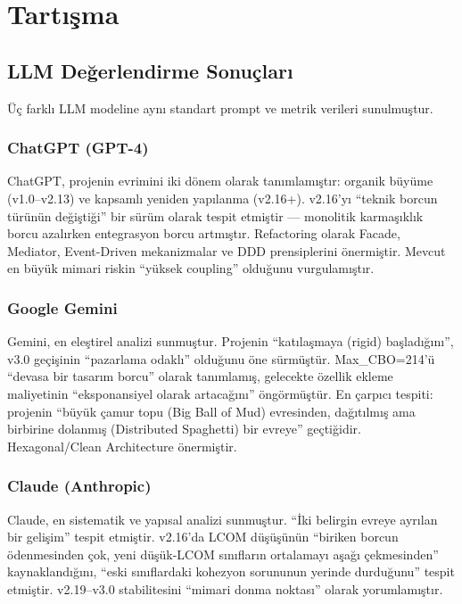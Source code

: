 \documentclass[conference]{IEEEtran}
\begin{document}
\section{Tart{\i}\c{s}ma}

\subsection{LLM De\u{g}erlendirme Sonu\c{c}lar{\i}}
\"U\c{c} farkl{\i} LLM modeline ayn{\i} standart prompt ve metrik verileri sunulmu\c{s}tur.

\subsubsection{ChatGPT (GPT-4)}
ChatGPT, projenin evrimini iki d\"onem olarak tan{\i}mlam{\i}\c{s}t{\i}r: organik b\"uy\"ume (v1.0--v2.13) ve kapsaml{\i} yeniden yap{\i}lanma (v2.16+). v2.16'y{\i} ``teknik borcun t\"ur\"un\"un de\u{g}i\c{s}ti\u{g}i'' bir s\"ur\"um olarak tespit etmi\c{s}tir --- monolitik karma\c{s}{\i}kl{\i}k borcu azal{\i}rken entegrasyon borcu artm{\i}\c{s}t{\i}r. Refactoring olarak Facade, Mediator, Event-Driven mekanizmalar ve DDD prensiplerini \"onermi\c{s}tir. Mevcut en b\"uy\"uk mimari riskin ``y\"uksek coupling'' oldu\u{g}unu vurgulam{\i}\c{s}t{\i}r.

\subsubsection{Google Gemini}
Gemini, en ele\c{s}tirel analizi sunmu\c{s}tur. Projenin ``kat{\i}la\c{s}maya (rigid) ba\c{s}lad{\i}\u{g}{\i}n{\i}'', v3.0 ge\c{c}i\c{s}inin ``pazarlama odakl{\i}'' oldu\u{g}unu \"one s\"urm\"u\c{s}t\"ur. Max\_CBO=214'\"u ``devasa bir tasar{\i}m borcu'' olarak tan{\i}mlam{\i}\c{s}, gelecekte \"ozellik ekleme maliyetinin ``eksponansiyel olarak artaca\u{g}{\i}n{\i}'' \"ong\"orm\"u\c{s}t\"ur. En \c{c}arp{\i}c{\i} tespiti: projenin ``b\"uy\"uk \c{c}amur topu (Big Ball of Mud) evresinden, da\u{g}{\i}t{\i}lm{\i}\c{s} ama birbirine dolanm{\i}\c{s} (Distributed Spaghetti) bir evreye'' ge\c{c}ti\u{g}idir. Hexagonal/Clean Architecture \"onermi\c{s}tir.

\subsubsection{Claude (Anthropic)}
Claude, en sistematik ve yap{\i}sal analizi sunmu\c{s}tur. ``\.{I}ki belirgin evreye ayr{\i}lan bir geli\c{s}im'' tespit etmi\c{s}tir. v2.16'da LCOM d\"u\c{s}\"u\c{s}\"un\"un ``biriken borcun \"odenmesinden \c{c}ok, yeni d\"u\c{s}\"uk-LCOM s{\i}n{\i}flar{\i}n ortalamay{\i} a\c{s}a\u{g}{\i} \c{c}ekmesinden'' kaynakland{\i}\u{g}{\i}n{\i}, ``eski s{\i}n{\i}flardaki kohezyon sorununun yerinde durdu\u{g}unu'' tespit etmi\c{s}tir. v2.19--v3.0 stabilitesini ``mimari donma noktas{\i}'' olarak yorumlam{\i}\c{s}t{\i}r.
\end{document}
